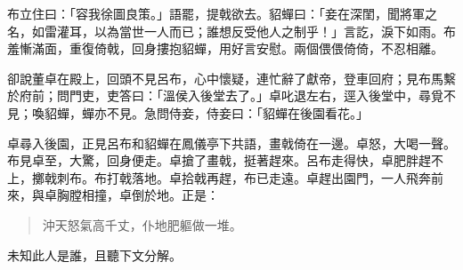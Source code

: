 布立住曰：「容我徐圖良策。」語罷，提戟欲去。貂蟬曰：「妾在深閨，聞將軍之名，如雷灌耳，以為當世一人而已；誰想反受他人之制乎！」言訖，淚下如雨。布羞慚滿面，重復倚戟，回身摟抱貂蟬，用好言安慰。兩個偎偎倚倚，不忍相離。

卻說董卓在殿上，回頭不見呂布，心中懷疑，連忙辭了獻帝，登車回府；見布馬繫於府前；問門吏，吏答曰：「溫侯入後堂去了。」卓叱退左右，逕入後堂中，尋覓不見；喚貂蟬，蟬亦不見。急問侍妾，侍妾曰：「貂蟬在後園看花。」

卓尋入後園，正見呂布和貂蟬在鳳儀亭下共語，畫戟倚在一邊。卓怒，大喝一聲。布見卓至，大驚，回身便走。卓搶了畫戟，挺著趕來。呂布走得快，卓肥胖趕不上，擲戟刺布。布打戟落地。卓拾戟再趕，布已走遠。卓趕出園門，一人飛奔前來，與卓胸膛相撞，卓倒於地。正是：

\begin{quote}
沖天怒氣高千丈，仆地肥軀做一堆。
\end{quote}

未知此人是誰，且聽下文分解。
